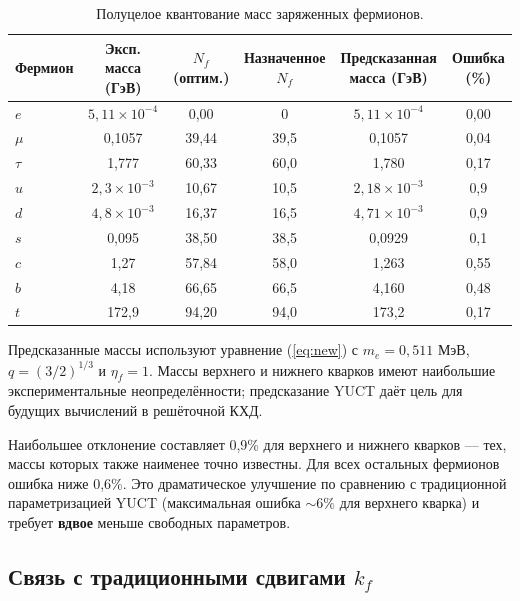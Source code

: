 \documentclass[12pt,a4paper]{article}
\begin{document}
	\begin{table}[H]
		\centering
		\caption{Полуцелое квантование масс заряженных фермионов.}
		\label{tab:new_masses}
		\small
		\begin{tabular}{l c c c c c}
			\toprule
			Фермион & Эксп. масса (ГэВ) & \(N_f\) (оптим.) & Назначенное \(N_f\) & Предсказанная масса (ГэВ) & Ошибка (\%) \\
			\midrule
			\(e\)   & \(5,11\times10^{-4}\) & 0,00  & 0      & \(5,11\times10^{-4}\) & 0,00 \\
			\(\mu\)  & 0,1057                & 39,44 & 39,5   & 0,1057               & 0,04 \\
			\(\tau\) & 1,777                 & 60,33 & 60,0   & 1,780                & 0,17 \\
			\(u\)   & \(2,3\times10^{-3}\)    & 10,67 & 10,5   & \(2,18\times10^{-3}\)  & 0,9 \\
			\(d\)   & \(4,8\times10^{-3}\)    & 16,37 & 16,5   & \(4,71\times10^{-3}\)  & 0,9 \\
			\(s\)   & 0,095                 & 38,50 & 38,5   & 0,0929               & 0,1 \\
			\(c\)   & 1,27                  & 57,84 & 58,0   & 1,263                & 0,55 \\
			\(b\)   & 4,18                  & 66,65 & 66,5   & 4,160                & 0,48 \\
			\(t\)   & 172,9                 & 94,20 & 94,0   & 173,2                & 0,17 \\
			\bottomrule
		\end{tabular}
		\par\smallskip
		\footnotesize Предсказанные массы используют уравнение (\ref{eq:new}) с \(m_e = 0,511\) МэВ, \(q = (3/2)^{1/3}\) и \(\eta_f = 1\). Массы верхнего и нижнего кварков имеют наибольшие экспериментальные неопределённости; предсказание YUCT даёт цель для будущих вычислений в решёточной КХД.
	\end{table}
	
	Наибольшее отклонение составляет 0,9\% для верхнего и нижнего кварков — тех, массы которых также наименее точно известны. Для всех остальных фермионов ошибка ниже 0,6\%. Это драматическое улучшение по сравнению с традиционной параметризацией YUCT (максимальная ошибка \(\sim 6\%\) для верхнего кварка) и требует \textbf{вдвое} меньше свободных параметров.
	
	\subsection{Связь с традиционными сдвигами \(k_f\)}
	
\end{document}
